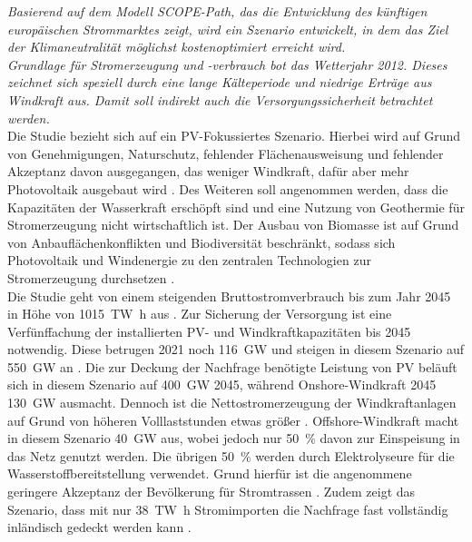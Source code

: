 		\textsl{Basierend auf dem Modell SCOPE-Path, das die Entwicklung des künftigen europäischen Strommarktes zeigt, wird ein Szenario entwickelt, in dem das Ziel der Klimaneutralität möglichst kostenoptimiert erreicht wird.\\
		Grundlage für Stromerzeugung und -verbrauch bot das Wetterjahr 2012. Dieses zeichnet sich speziell durch eine lange Kälteperiode und niedrige Erträge aus Windkraft aus. Damit soll indirekt auch die Versorgungssicherheit betrachtet werden.\cite[S.2]{ESRa_Fraunhofer}} \\
		
		Die Studie bezieht sich auf ein PV-Fokussiertes Szenario. 
		Hierbei wird auf Grund von Genehmigungen, Naturschutz, fehlender Flächenausweisung und fehlender Akzeptanz davon ausgegangen, das weniger Windkraft, dafür aber mehr Photovoltaik ausgebaut wird \cite[S.4]{ESRa_Fraunhofer}.
		Des Weiteren soll angenommen werden, dass die Kapazitäten der Wasserkraft erschöpft sind und eine Nutzung von Geothermie für Stromerzeugung nicht wirtschaftlich ist. 
		Der Ausbau von Biomasse ist auf Grund von Anbauflächenkonflikten und Biodiversität beschränkt, sodass sich Photovoltaik und Windenergie zu den zentralen Technologien zur Stromerzeugung durchsetzen \cite[S.6]{ESRa_Fraunhofer}. \\
		
		Die Studie geht von einem steigenden Bruttostromverbrauch bis zum Jahr 2045 in Höhe von \SI{1015}{\tera\watt\hour} aus \cite[S.10]{ESRa_Fraunhofer}. 
		Zur Sicherung der Versorgung ist eine Verfünffachung der installierten PV- und Windkraftkapazitäten bis 2045 notwendig. 
		Diese betrugen 2021 noch \SI{116}{\giga\watt} und steigen in diesem Szenario auf \SI{550}{\giga\watt} an \cite[S.7]{ESRa_Fraunhofer}.
		Die zur Deckung der Nachfrage benötigte Leistung von PV beläuft sich in diesem Szenario auf \SI{400}{\giga\watt} 2045, während Onshore-Windkraft 2045 \SI{130}{\giga\watt} ausmacht. 
		Dennoch ist die Nettostromerzeugung der Windkraftanlagen auf Grund von höheren Volllaststunden etwas größer \cite[S.7]{ESRa_Fraunhofer}. 
		Offshore-Windkraft macht in diesem Szenario \SI{40}{\giga\watt} aus, wobei jedoch nur \SI{50}{\percent} davon zur Einspeisung in das Netz genutzt werden. 
		Die übrigen \SI{50}{\percent} werden durch Elektrolyseure für die Wasserstoffbereitstellung verwendet. 
		Grund hierfür ist die angenommene geringere Akzeptanz der Bevölkerung für Stromtrassen \cite[S.7]{ESRa_Fraunhofer}. 
		Zudem zeigt das Szenario, dass mit nur \SI{38}{\tera\watt\hour} Stromimporten die Nachfrage fast vollständig inländisch gedeckt werden kann \cite[S.16]{ESRa_Fraunhofer}. \\
		
